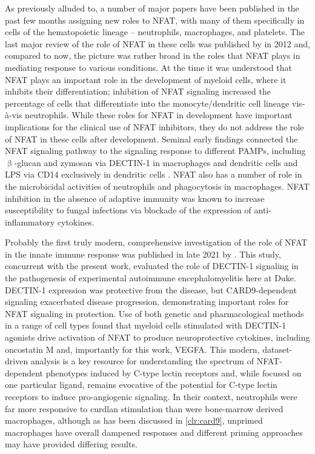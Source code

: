 As previously alluded to, a number of major papers have been published in the past few months assigning new roles to NFAT, with many of them specifically in cells of the hematopoietic lineage -- neutrophils, macrophages, and platelets. The last major review of the role of NFAT in these cells was published by \citeauthor{Fric2012a} in 2012 and, compared to now, the picture was rather broad in the roles that NFAT plays in mediating response to various conditions. At the time it was understood that NFAT plays an important role in the development of myeloid cells, where it inhibits their differentiation; inhibition of NFAT signaling increased the percentage of cells that differentiate into the monocyte/dendritic cell lineage vis\hyp{}\`{a}\hyp{}vis neutrophils. While these roles for NFAT in development have important implications for the clinical use of NFAT inhibitors, they do not address the role of NFAT in these cells after development. Seminal early findings connected the NFAT signaling pathway to the signaling response to different PAMPs, including $\upbeta$\hyp{}glucan and zymosan via DECTIN\hyp{}1 in macrophages and dendritic cells and LPS via CD14 exclusively in dendritic cells \citep{Goodridge2007, Zanoni2009}. NFAT also has a number of role in the microbicidal activities of neutrophils and phagocytosis in macrophages. NFAT inhibition in the absence of adaptive immunity was known to increase susceptibility to fungal infections via blockade of the expression of anti\hyp{}inflammatory cytokines. 

Probably the first truly modern, comprehensive investigation of the role of NFAT in the innate immune response was published in late 2021 by \citeauthor{Deerhake2021}. This study, concurrent with the present work, evaluated the role of DECTIN\hyp{}1 signaling in the pathogenesis of experimental autoimmune encephalomyelitis \citep{Deerhake2021} here at Duke. DECTIN\hyp{}1 expression was protective from the disease, but CARD9\hyp{}dependent signaling exacerbated disease progression, demonstrating important roles for NFAT signaling in protection. Use of both genetic and pharmacological methods in a range of cell types found that myeloid cells stimulated with DECTIN\hyp{}1 agonists drive activation of NFAT to produce neuroprotective cytokines, including oncostatin M and, importantly for this work, VEGFA. This modern, dataset\hyp{}driven analysis is a key resource for understanding the spectrum of NFAT\hyp{}dependent phenotypes induced by C\hyp{}type lectin receptors and, while focused on one particular ligand, remains evocative of the potential for C\hyp{}type lectin receptors to induce pro\hyp{}angiogenic signaling. In their context, neutrophils were far more responsive to curdlan stimulation than were bone\hyp{}marrow derived macrophages, although as has been discussed in \autoref{clr:card9}, unprimed macrophages have overall dampened responses and different priming approaches may have provided differing results.

